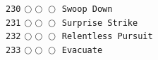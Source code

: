 \documentclass[a4paper,landscape]{article}
\begin{document}
\begin{multicols*}{5}
\texttt{230} \(\bigcirc\!\bigcirc\!\bigcirc\)  \texttt{Swoop Down} \vspace{-0.3mm}\\ 
\texttt{231} \(\bigcirc\!\bigcirc\!\bigcirc\)  \texttt{Surprise Strike} \vspace{-0.3mm}\\ 
\texttt{232} \(\bigcirc\!\bigcirc\!\bigcirc\)  \texttt{Relentless Pursuit} \vspace{-0.3mm}\\ 
\texttt{233} \(\bigcirc\!\bigcirc\!\bigcirc\)  \texttt{Evacuate} \vspace{-0.3mm}\\ 

\end{multicols*}
\end{document}
